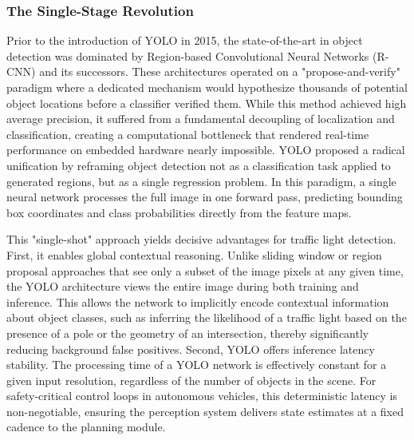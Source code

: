 \subsubsection{The Single-Stage Revolution}

Prior to the introduction of YOLO in 2015, the state-of-the-art in object detection was dominated by Region-based Convolutional Neural Networks (R-CNN) and its successors. These architectures operated on a "propose-and-verify" paradigm where a dedicated mechanism would hypothesize thousands of potential object locations before a classifier verified them. While this method achieved high average precision, it suffered from a fundamental decoupling of localization and classification, creating a computational bottleneck that rendered real-time performance on embedded hardware nearly impossible. YOLO proposed a radical unification by reframing object detection not as a classification task applied to generated regions, but as a single regression problem. In this paradigm, a single neural network processes the full image in one forward pass, predicting bounding box coordinates and class probabilities directly from the feature maps.

This "single-shot" approach yields decisive advantages for traffic light detection. First, it enables global contextual reasoning. Unlike sliding window or region proposal approaches that see only a subset of the image pixels at any given time, the YOLO architecture views the entire image during both training and inference. This allows the network to implicitly encode contextual information about object classes, such as inferring the likelihood of a traffic light based on the presence of a pole or the geometry of an intersection, thereby significantly reducing background false positives. Second, YOLO offers inference latency stability. The processing time of a YOLO network is effectively constant for a given input resolution, regardless of the number of objects in the scene. For safety-critical control loops in autonomous vehicles, this deterministic latency is non-negotiable, ensuring the perception system delivers state estimates at a fixed cadence to the planning module.

